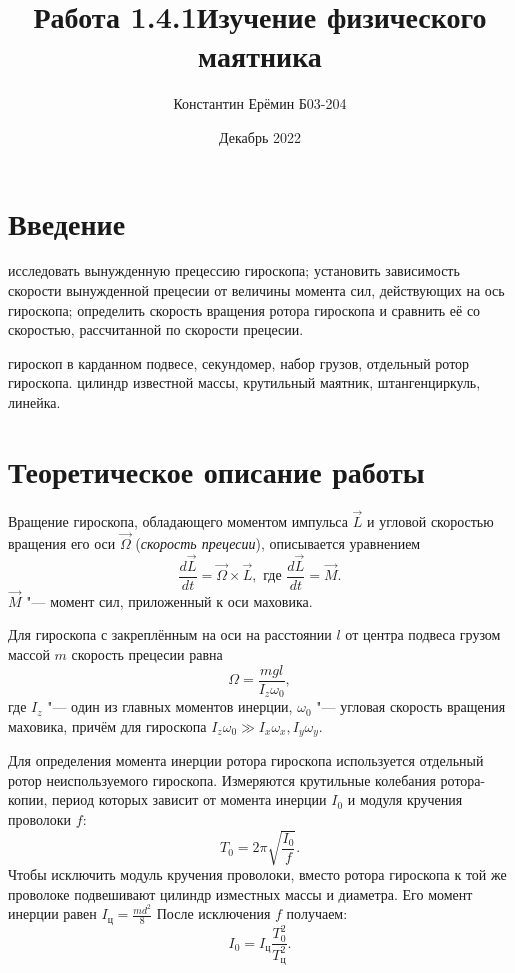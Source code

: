

\title{\textbf{Работа 1.4.1}\linebreak Изучение физического маятника}
\author{Константин Ерёмин Б03-204}
\date{Декабрь 2022}


    \maketitle

    \section{Введение}
        \begin{target}
            исследовать вынужденную прецессию гироскопа; установить зависимость скорости вынужденной прецесии от величины момента сил, действующих на ось гироскопа; определить скорость вращения ротора гироскопа и сравнить её со скоростью, рассчитанной по скорости прецесии.
        \end{target}

        \begin{setting}
            гироскоп в карданном подвесе, секундомер, набор грузов, отдельный ротор гироскопа. цилиндр известной массы, крутильный маятник, штангенциркуль, линейка.
        \end{setting}

    \section{Теоретическое описание работы}
        Вращение гироскопа, обладающего моментом импульса $\vec L$ и угловой скоростью вращения его оси $\vec \Omega$ (\emph{скорость прецесии}), описывается уравнением
        \[\frac{d\vec{L}}{dt} = \vec \Omega \times \vec L, \text{ где } \frac{d\vec{L}}{dt} = \vec M.\]
        $\vec M$ "--- момент сил, приложенный к оси маховика.

        Для гироскопа с закреплённым на оси на расстоянии $l$ от центра подвеса грузом массой $m$ скорость прецесии равна
        \[\Omega = \frac{mgl}{I_z\omega_0},\]
        где $I_z$ "--- один из главных моментов инерции, $\omega_0$ "--- угловая скорость вращения маховика, причём для гироскопа $I_z \omega_0 \gg I_x \omega_x, I_y \omega_y$.
        
        Для определения момента инерции ротора гироскопа используется отдельный ротор неиспользуемого гироскопа. Измеряются крутильные колебания ротора-копии, период которых зависит от момента инерции $I_0$ и модуля кручения проволоки $f$:
        \begin{equation}
            T_0 = 2\pi \sqrt{\frac{I_0}{f}}.    
        \end{equation}
        Чтобы исключить модуль кручения проволоки, вместо ротора гироскопа к той же проволоке подвешивают цилиндр изместных массы и диаметра. Его момент инерции равен $I_\text{ц} = \frac{md^2}{8}$ После исключения $f$ получаем:
        \begin{equation}
            I_0 = I_\text{ц} \frac{T_0^2}{T_\text{ц}^2}.
            \label{eq:inertia}
        \end{equation}

